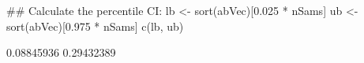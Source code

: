 \begin{Schunk}
\begin{Sinput}
 ## Calculate the percentile CI:
 lb <- sort(abVec)[0.025 * nSams]
 ub <- sort(abVec)[0.975 * nSams]
 c(lb, ub)
\end{Sinput}
\begin{Soutput}
[1] 0.08845936 0.29432389
\end{Soutput}
\end{Schunk}

